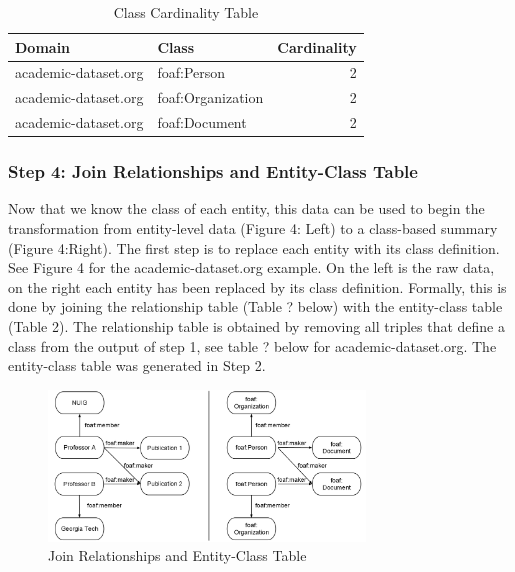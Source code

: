 \documentclass[11pt,onecolumn]{article}
\begin{document}
\begin{table}[h!]
\begin{center}
  \begin{tabular}{| l | l | r | }
    \hline
    {\bf Domain} & {\bf Class} & {\bf Cardinality} \\ \hline    
    academic-dataset.org & foaf:Person & 2\\ \hline
    academic-dataset.org & foaf:Organization & 2 \\ \hline
    academic-dataset.org & foaf:Document & 2\\ \hline
  \end{tabular}
\end{center}
\caption{Class Cardinality Table}
\end{table}


\subsubsection{Step 4: Join Relationships and Entity-Class Table}

Now that we know the class of each entity, this data can be used to begin the transformation from entity-level data (Figure 4: Left) to a class-based summary (Figure 4:Right).  The first step is to replace each entity with its class definition.  See Figure 4 for the academic-dataset.org example.  On the left is the raw data, on the right each entity has been replaced by its class definition.  Formally, this is done by joining the relationship table (Table ? below) with the entity-class table (Table 2).  The relationship table is obtained by removing all triples that define a class from the output of step 1, see table ? below for academic-dataset.org.  The entity-class table was generated in Step 2.  

\begin{figure}
  \centering
    \includegraphics[width=0.75\textwidth]{MergeData.png}
    \caption{Join Relationships and Entity-Class Table}
\end{figure}
\end{document}
